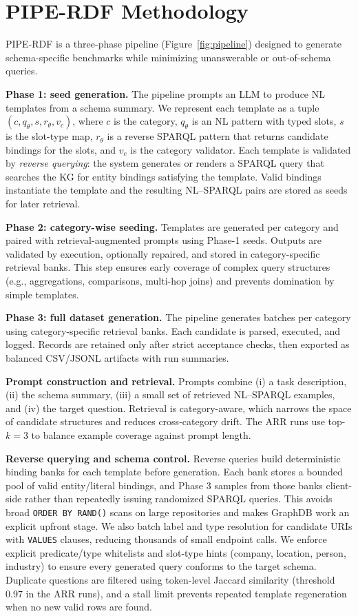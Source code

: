 \documentclass[11pt]{article}
\begin{document}
\section{PIPE-RDF Methodology}
PIPE-RDF is a three-phase pipeline (Figure~\ref{fig:pipeline}) designed to generate schema-specific benchmarks while minimizing unanswerable or out-of-schema queries.

\textbf{Phase 1: seed generation.} The pipeline prompts an LLM to produce NL templates from a schema summary. We represent each template as a tuple \((c, q_{\theta}, s, r_{\theta}, v_c)\), where \(c\) is the category, \(q_{\theta}\) is an NL pattern with typed slots, \(s\) is the slot-type map, \(r_{\theta}\) is a reverse SPARQL pattern that returns candidate bindings for the slots, and \(v_c\) is the category validator. Each template is validated by \emph{reverse querying}: the system generates or renders a SPARQL query that searches the KG for entity bindings satisfying the template. Valid bindings instantiate the template and the resulting NL--SPARQL pairs are stored as seeds for later retrieval.

\textbf{Phase 2: category-wise seeding.} Templates are generated per category and paired with retrieval-augmented prompts using Phase-1 seeds. Outputs are validated by execution, optionally repaired, and stored in category-specific retrieval banks. This step ensures early coverage of complex query structures (e.g., aggregations, comparisons, multi-hop joins) and prevents domination by simple templates.

\textbf{Phase 3: full dataset generation.} The pipeline generates batches per category using category-specific retrieval banks. Each candidate is parsed, executed, and logged. Records are retained only after strict acceptance checks, then exported as balanced CSV/JSONL artifacts with run summaries.

\textbf{Prompt construction and retrieval.} Prompts combine (i) a task description, (ii) the schema summary, (iii) a small set of retrieved NL--SPARQL examples, and (iv) the target question. Retrieval is category-aware, which narrows the space of candidate structures and reduces cross-category drift. The ARR runs use top-$k=3$ to balance example coverage against prompt length.

\textbf{Reverse querying and schema control.} Reverse queries build deterministic binding banks for each template before generation. Each bank stores a bounded pool of valid entity/literal bindings, and Phase 3 samples from those banks client-side rather than repeatedly issuing randomized SPARQL queries. This avoids broad \texttt{ORDER BY RAND()} scans on large repositories and makes GraphDB work an explicit upfront stage. We also batch label and type resolution for candidate URIs with \texttt{VALUES} clauses, reducing thousands of small endpoint calls. We enforce explicit predicate/type whitelists and slot-type hints (company, location, person, industry) to ensure every generated query conforms to the target schema. Duplicate questions are filtered using token-level Jaccard similarity (threshold 0.97 in the ARR runs), and a stall limit prevents repeated template regeneration when no new valid rows are found.
\end{document}
